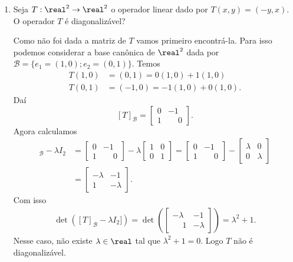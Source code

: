 \begin{exemplo}
    \begin{enumerate}[label={\arabic*})]
        \item Seja $T : \real^2 \to \real^2$ o operador linear dado por $T(x,y) = (-y,x)$. O operador $T$ é diagonalizável?
        \begin{solucao}
            Como não foi dada a matriz de $T$ vamos primeiro encontrá-la. Para isso podemos considerar a base canônica de $\real^2$ dada por $\mathcal{B} = \{e_1 = (1,0); e_2 = (0,1)\}$. Temos
            \begin{align}
                T(1,0) &= (0,1) = 0(1,0) + 1(1,0)\\
                T(0,1) &= (-1,0) = -1(1,0) + 0(1,0).
            \end{align}
            Daí
            \[
                [T]_\mathcal{B} = \begin{bmatrix}0 & -1\\ 1 & \phantom{-}0\end{bmatrix}.
            \]
            Agora calculamos
            \begin{align*}
                [T]_\mathcal{B} - \lambda I_2 &= \begin{bmatrix}0 & -1\\ 1 & \phantom{-}0\end{bmatrix} - \lambda\begin{bmatrix}1 & 0\\0 & 1\end{bmatrix} = \begin{bmatrix}0 & -1\\ 1 & \phantom{-}0\end{bmatrix} - \begin{bmatrix}\lambda & 0\\0 & \lambda\end{bmatrix}\\ &= \begin{bmatrix}-\lambda & -1\\ 1 & -\lambda\end{bmatrix}.
            \end{align*}
            Com isso
            \begin{align*}
                \det([T]_\mathcal{B} - \lambda I_2]) = \det\left(\begin{bmatrix} -\lambda & -1\\\phantom{-}1 & -\lambda\end{bmatrix}\right) = \lambda^2 + 1.
            \end{align*}
            Nesse caso, não existe $\lambda \in \real$ tal que $\lambda^2 + 1 = 0$. Logo $T$ não é diagonalizável.
        \end{solucao}


\end{enumerate}
\end{exemplo}
